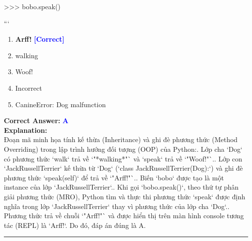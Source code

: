 \documentclass[11pt,a4paper]{article}
\begin{document}
\begin{minipage}{\textwidth}
{\newline
>>> bobo.speak()\newline

\newline
```}

\begin{enumerate}[label=\Alph*.]
    \item \textbf{Arff!} \hfill \textcolor{blue}{\textbf{[Correct]}}
    \item walking
    \item Woof!
    \item Incorrect
    \item CanineError: Dog malfunction
\end{enumerate}

\noindent \textbf{Correct Answer:} \textcolor{blue}{\textbf{A}} \\[4pt]
\noindent \textbf{Explanation:}\\
Đoạn mã minh họa tính kế thừa (Inheritance) và ghi đè phương thức (Method Overriding) trong lập trình hướng đối tượng (OOP) của Python:. Lớp cha `Dog` có phương thức `walk` trả về `"*walking*"` và `speak` trả về `"Woof!"`.. Lớp con `JackRussellTerrier` kế thừa từ `Dog` (`class JackRussellTerrier(Dog):`) và ghi đè phương thức `speak(self)` để trả về `"Arff!"`.. Biến `bobo` được tạo là một instance của lớp `JackRussellTerrier`.. Khi gọi `bobo.speak()`, theo thứ tự phân giải phương thức (MRO), Python tìm và thực thi phương thức `speak` được định nghĩa trong lớp `JackRussellTerrier` thay vì phương thức của lớp cha `Dog`.. Phương thức trả về chuỗi `"Arff!"` và được hiển thị trên màn hình console tương tác (REPL) là `Arff!`.\newline
Do đó, đáp án đúng là A.
\end{minipage}
\vspace{0.8cm}
\hrule
\vspace{0.5cm}
\end{document}
